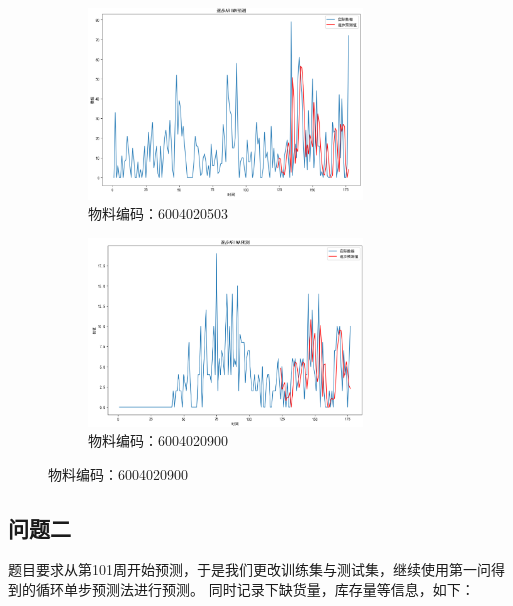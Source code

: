\documentclass{cumcmthesis}
\begin{document}
\begin{figure}[ht]
            \begin{subfigure}[b]{0.49\textwidth}
                \includegraphics[width=0.8\textwidth]{graph/graph_9.png}
                \caption{物料编码：6004020503}
                \label{fig:image5}
            \end{subfigure}
            \hfill %
            \begin{subfigure}[b]{0.49\textwidth}
                \includegraphics[width=0.8\textwidth]{graph/graph_8.png}
                \caption{物料编码：6004020900}
                \label{fig:image6}
            \end{subfigure}
        \end{figure}
        \FloatBarrier    %

        \subsection{问题二}
        题目要求从第101周开始预测，于是我们更改训练集与测试集，继续使用第一问得到的循环单步预测法进行预测。
        同时记录下缺货量，库存量等信息，如下：\\
        
\end{document}
